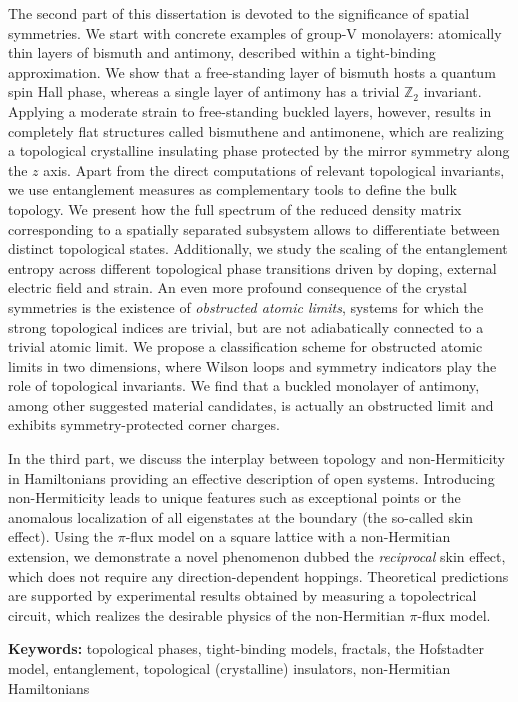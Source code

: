 The second part of this dissertation is devoted to the significance of spatial symmetries. We start with concrete examples of group-V monolayers: atomically thin layers of bismuth and antimony, described within a tight-binding approximation. We show that a free-standing layer of bismuth hosts a quantum spin Hall phase, whereas a single layer of antimony has a trivial $\mathbb{Z}_2$ invariant. Applying a moderate strain to free-standing buckled layers, however, results in completely flat structures called bismuthene and antimonene, which are realizing a topological crystalline insulating phase protected by the mirror symmetry along the $z$ axis. Apart from the direct computations of relevant topological invariants, we use entanglement measures as complementary tools to define the bulk topology. We present how the full spectrum of the reduced density matrix corresponding to a spatially separated subsystem allows to differentiate between distinct topological states. Additionally, we study the scaling of the entanglement entropy across different topological phase transitions driven by doping, external electric field and strain.
An even more profound consequence of the crystal symmetries is the existence of \emph{obstructed atomic limits}, \ie systems for which the strong topological indices are trivial, but are not adiabatically connected to a trivial atomic limit. We propose a classification scheme for obstructed atomic limits in two dimensions, where Wilson loops and symmetry indicators play the role of topological invariants. We find that a buckled monolayer of antimony, among other suggested material candidates, is actually an obstructed limit and exhibits symmetry-protected corner charges.

In the third part, we discuss the interplay between topology and non-Hermiticity in Hamiltonians providing an effective description of open systems. Introducing non-Hermiticity leads to unique features such as exceptional points or the anomalous localization of all eigenstates at the boundary (the so-called skin effect). Using the $\pi$-flux model on a square lattice with a non-Hermitian extension, we demonstrate a novel phenomenon dubbed the \emph{reciprocal} skin effect, which does not require any direction-dependent hoppings. Theoretical predictions are supported by experimental results obtained by measuring a topolectrical circuit, which realizes the desirable physics of the non-Hermitian $\pi$-flux model.

\vspace{1cm}
\hspace{-0.4cm}\textbf{Keywords:} topological phases, tight-binding models, fractals, the Hofstadter model, entanglement, topological (crystalline) insulators, non-Hermitian Hamiltonians
\endgroup


